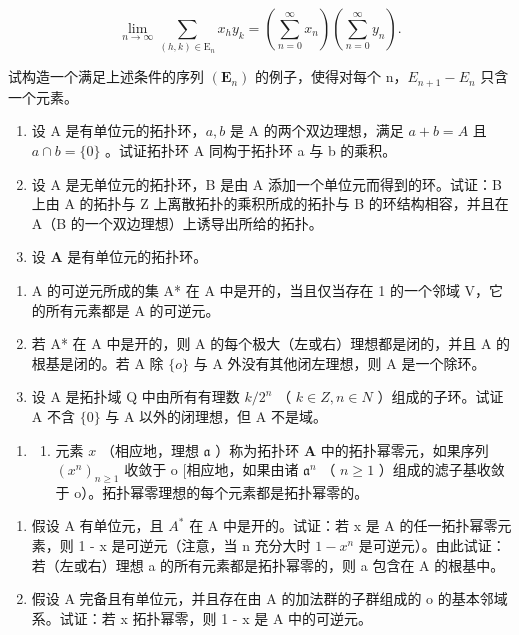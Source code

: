 \[
\lim _ {n \rightarrow \infty} \sum_ {(h, k) \in \mathrm{E} _ {n}} x _ {h} y _ {k} = \left(\underset {n = 0} {\overset {\infty} {\sum}} x _ {n}\right)\left(\underset {n = 0} {\overset {\infty} {\sum}} y _ {n}\right).
\]

试构造一个满足上述条件的序列 \((\mathbf{E}_{n})\) 的例子，使得对每个 n，\(E_{n+1} - E_{n}\) 只含一个元素。

\begin{enumerate}
\def\labelenumi{\arabic{enumi})}
\setcounter{enumi}{5}
\item
  设 A 是有单位元的拓扑环，\(a, b\) 是 A 的两个双边理想，满足 \(a + b = A\) 且 \(a \cap b = \{0\}\) 。试证拓扑环 A 同构于拓扑环 a 与 b 的乘积。
\item
  设 A 是无单位元的拓扑环，B 是由 A 添加一个单位元而得到的环。试证：B 上由 A 的拓扑与 Z 上离散拓扑的乘积所成的拓扑与 B 的环结构相容，并且在 A（B 的一个双边理想）上诱导出所给的拓扑。
\item
  设 \(\mathbf{A}\) 是有单位元的拓扑环。
\end{enumerate}

\begin{enumerate}
\def\labelenumi{\alph{enumi})}
\item
  A 的可逆元所成的集 A* 在 A 中是开的，当且仅当存在 1 的一个邻域 V，它的所有元素都是 A 的可逆元。
\item
  若 A* 在 A 中是开的，则 A 的每个极大（左或右）理想都是闭的，并且 A 的根基是闭的。若 A 除 \(\{o\}\) 与 A 外没有其他闭左理想，则 A 是一个除环。
\item
  设 A 是拓扑域 Q 中由所有有理数 \(k/2^{n}\) （ \(k \in Z, n \in N\) ）组成的子环。试证 A 不含 \(\{0\}\) 与 A 以外的闭理想，但 A 不是域。
\end{enumerate}

\begin{enumerate}
\def\labelenumi{\arabic{enumi})}
\setcounter{enumi}{8}
\tightlist
\item
  \begin{enumerate}
  \def\labelenumii{\alph{enumii})}
  \tightlist
  \item
    元素 \(x\) （相应地，理想 \(\mathfrak{a}\) ）称为拓扑环 \(\mathbf{A}\) 中的拓扑幂零元，如果序列 \((x^n)_{n\geqslant 1}\) 收敛于 o {[}相应地，如果由诸 \(\mathfrak{a}^n\) （ \(n\geqslant 1\) ）组成的滤子基收敛于 o）。拓扑幂零理想的每个元素都是拓扑幂零的。
  \end{enumerate}
\end{enumerate}

\begin{enumerate}
\def\labelenumi{\alph{enumi})}
\setcounter{enumi}{1}
\item
  假设 A 有单位元，且 \(A^{*}\) 在 A 中是开的。试证：若 x 是 A 的任一拓扑幂零元素，则 1 - x 是可逆元（注意，当 n 充分大时 \(1 - x^{n}\) 是可逆元）。由此试证：若（左或右）理想 a 的所有元素都是拓扑幂零的，则 a 包含在 A 的根基中。
\item
  假设 A 完备且有单位元，并且存在由 A 的加法群的子群组成的 o 的基本邻域系。试证：若 x 拓扑幂零，则 1 - x 是 A 中的可逆元。
\end{enumerate}

